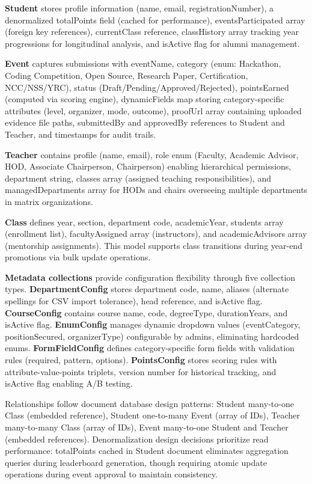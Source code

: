 \documentclass[12pt]{article}
\begin{document}
\textbf{Student} stores profile information (name, email, registrationNumber), a denormalized totalPoints field (cached for performance), eventsParticipated array (foreign key references), currentClass reference, classHistory array tracking year progressions for longitudinal analysis, and isActive flag for alumni management.

\textbf{Event} captures submissions with eventName, category (enum: Hackathon, Coding Competition, Open Source, Research Paper, Certification, NCC/NSS/YRC), status (Draft/Pending/Approved/Rejected), pointsEarned (computed via scoring engine), dynamicFields map storing category-specific attributes (level, organizer, mode, outcome), proofUrl array containing uploaded evidence file paths, submittedBy and approvedBy references to Student and Teacher, and timestamps for audit trails.

\textbf{Teacher} contains profile (name, email), role enum (Faculty, Academic Advisor, HOD, Associate Chairperson, Chairperson) enabling hierarchical permissions, department string, classes array (assigned teaching responsibilities), and managedDepartments array for HODs and chairs overseeing multiple departments in matrix organizations.

\textbf{Class} defines year, section, department code, academicYear, students array (enrollment list), facultyAssigned array (instructors), and academicAdvisors array (mentorship assignments). This model supports class transitions during year-end promotions via bulk update operations.

\textbf{Metadata collections} provide configuration flexibility through five collection types. \textbf{DepartmentConfig} stores department code, name, aliases (alternate spellings for CSV import tolerance), head reference, and isActive flag. \textbf{CourseConfig} contains course name, code, degreeType, durationYears, and isActive flag. \textbf{EnumConfig} manages dynamic dropdown values (eventCategory, positionSecured, organizerType) configurable by admins, eliminating hardcoded enums. \textbf{FormFieldConfig} defines category-specific form fields with validation rules (required, pattern, options). \textbf{PointsConfig} stores scoring rules with attribute-value-points triplets, version number for historical tracking, and isActive flag enabling A/B testing.

Relationships follow document database design patterns: Student many-to-one Class (embedded reference), Student one-to-many Event (array of IDs), Teacher many-to-many Class (array of IDs), Event many-to-one Student and Teacher (embedded references). Denormalization design decisions prioritize read performance: totalPoints cached in Student document eliminates aggregation queries during leaderboard generation, though requiring atomic update operations during event approval to maintain consistency.
\end{document}
